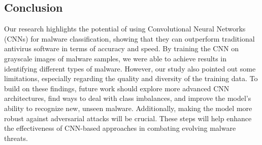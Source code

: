 \documentclass[conference]{IEEEtran}
\begin{document}
\setlength{\parskip}{10pt}

\subsection{Conclusion}
Our research highlights the potential of using Convolutional Neural Networks (CNNs) for malware classification, showing that they can outperform traditional antivirus software in terms of accuracy and speed. By training the CNN on grayscale images of malware samples, we were able to achieve results in identifying different types of malware. However, our study also pointed out some limitations, especially regarding the quality and diversity of the training data. To build on these findings, future work should explore more advanced CNN architectures, find ways to deal with class imbalances, and improve the model’s ability to recognize new, unseen malware. Additionally, making the model more robust against adversarial attacks will be crucial. These steps will help enhance the effectiveness of CNN-based approaches in combating evolving malware threats.
\end{document}
